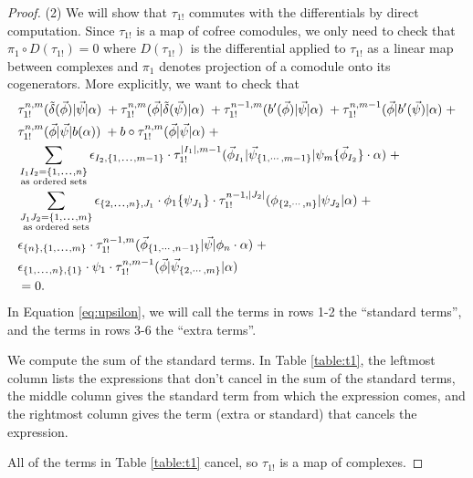 \begin{proof}
(2) We will show that $\tau_{1!}$ commutes with 
the differentials by direct computation. Since 
$\tau_{1!}$ is a map of cofree comodules, we only 
need to check that $\pi_1 \circ D(\tau_{1!}) = 0$ 
where $D(\tau_{1!})$ is the differential applied 
to $\tau_{1!}$ as a linear map between complexes 
and $\pi_1$ denotes projection of a comodule 
onto its cogenerators. More explicitly, we want 
to check that
\begin{equation} \label{eq:upsilon}
\begin{aligned}
&\tau_{1!}^{n, m} ( \tilde{\delta}(\vec{\phi}) | \vec{\psi} | \alpha ) \; + 
\tau_{1!}^{n, m} ( \vec{\phi} | \tilde{\delta}(\vec{\psi}) | \alpha ) \; + 
\tau_{1!}^{n-1, m} ( b^\prime(\vec{\phi}) | \vec{\psi} | \alpha ) \; + 
\tau_{1!}^{n, m-1} ( \vec{\phi} | b^\prime(\vec{\psi}) | \alpha ) \; + \\
&\tau_{1!}^{n, m} ( \vec{\phi} | \vec{\psi} | b(\alpha) ) \; + 
b \circ \tau_{1!}^{n, m} ( \vec{\phi} | \vec{\psi} | \alpha ) \; + \\
& \sum \limits_{\substack{
  I_1I_2 = \{1,\smdots,n\}\\ 
  \textrm{as ordered sets}}}
  \epsilon_{I_2,\{1,\smdots,m-1\}}\cdot
  \tau_{1!}^{|I_1|, m-1}(\vec{\phi}_{I_1} | \vec{\psi}_{\{1,\cdots, m-1\}} | \psi_{m} \{\vec{\phi}_{I_2}\} \cdot \alpha ) \; + \\
& \sum \limits_{\substack{
  J_1J_2 = \{1,\smdots,m\}\\ 
  \textrm{as ordered sets}}}
  \epsilon_{\{2,\smdots,n\},J_1}\cdot
\phi_1 \{ \psi_{J_1}\}\cdot \tau_{1!}^{n-1, |J_2|}(\phi_{\{2,\cdots , n\}} | \psi_{J_2} | \alpha ) \; + \\  
& \epsilon_{\{n\},\{1,\smdots,m\}}\cdot
  \tau_{1!}^{n-1, m}(\vec{\phi}_{\{1,\cdots, n-1\}} |\vec{\psi} | \phi_{n}\cdot \alpha) \; + \\
& \epsilon_{\{1,\smdots,n\},\{1\}}\cdot
\psi_1\cdot \tau_{1!}^{n,m-1} ( \vec{\phi} | \vec{\psi}_{\{2,\cdots, m\}} | \alpha) \\ 
&= 0.
\end{aligned}
\end{equation}
In Equation \ref{eq:upsilon}, we will call the 
terms in rows 1-2 the ``standard terms'', 
and the terms in rows 3-6 the 
``extra terms''.

We compute the sum of the standard terms. 
In Table \ref{table:t1}, the leftmost column 
lists the expressions that don't cancel in 
the sum of the standard terms, the middle 
column gives the standard term from which 
the expression comes, and the rightmost 
column gives the term (extra or standard) 
that cancels the expression. 

All of the terms in Table \ref{table:t1} 
cancel, so $\tau_{1!}$ is a map of complexes.
\end{proof}
